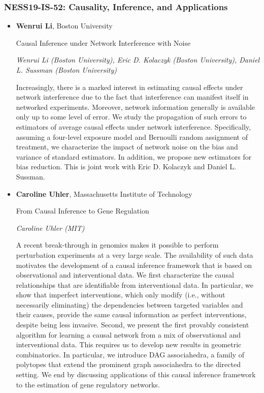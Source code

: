 \subsubsection*{NESS19-IS-52: Causality, Inference, and Applications}

\begin{itemize}
\item \textbf{Wenrui Li}, Boston University

Causal Inference under Network Interference with Noise

\emph{\footnotesize Wenrui Li (Boston University), Eric D. Kolaczyk (Boston University), Daniel L. Sussman (Boston University)}

Increasingly, there is a marked interest in estimating causal effects under network interference due to the fact that interference can manifest itself in networked experiments. Moreover, network information generally is available only up to some level of error. We study the propagation of such errors to estimators of average causal effects under network interference. Specifically, assuming a four-level exposure model and Bernoulli random assignment of treatment, we characterize the impact of network noise on the bias and variance of standard estimators. In addition, we propose new estimators for bias reduction. This is joint work with Eric D. Kolaczyk and Daniel L. Sussman.


\item \textbf{Caroline Uhler}, Massachusetts Institute of Technology

From Causal Inference to Gene Regulation

\emph{\footnotesize Caroline Uhler (MIT)}

A recent break-through in genomics makes it possible to perform perturbation experiments at a very large scale. The availability of such data motivates the development of a causal inference framework that is based on observational and interventional data. We first characterize the causal relationships that are identifiable from interventional data. In particular, we show that imperfect interventions, which only modify (i.e., without necessarily eliminating) the dependencies between targeted variables and their causes, provide the same causal information as perfect interventions, despite being less invasive. Second, we present the first provably consistent algorithm for learning a causal network from a mix of observational and interventional data. This requires us to develop new results in geometric combinatorics. In particular, we introduce DAG associahedra, a family of polytopes that extend the prominent graph associahedra to the directed setting. We end by discussing applications of this causal inference framework to the estimation of gene regulatory networks. 



\end{itemize}
